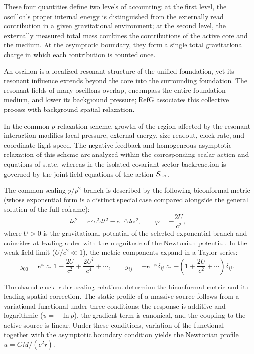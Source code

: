 \documentclass[11pt,a4paper]{article}
\newcommand{\RefG}{\mathrm{RefG}}
\begin{document}
These four quantities define two levels of accounting: at the first level, the oscillon's proper internal energy is distinguished from the externally read contribution in a given gravitational environment; at the second level, the externally measured total mass combines the contributions of the active core and the medium. At the asymptotic boundary, they form a single total gravitational charge in which each contribution is counted once.

An oscillon is a localized resonant structure of the unified foundation, yet its resonant influence extends beyond the core into the surrounding foundation. The resonant fields of many oscillons overlap, encompass the entire foundation-medium, and lower its background pressure; $\RefG$ associates this collective process with background spatial relaxation.

In the common-$p$ relaxation scheme, growth of the region affected by the resonant interaction modifies local pressure, external energy, size readout, clock rate, and coordinate light speed. The negative feedback and homogeneous asymptotic relaxation of this scheme are analyzed within the corresponding scalar action and equations of state, whereas in the isolated covariant sector backreaction is governed by the joint field equations of the action $S_{\rm iso}$.

The common-scaling $p/p^2$ branch is described by the following biconformal metric (whose exponential form is a distinct special case compared alongside the general solution of the full coframe):
\begin{equation}
ds^2 = e^\varphi c^2 dt^2 - e^{-\varphi} d\boldsymbol{\sigma}^2, \qquad \varphi = -\frac{2U}{c^2},
\end{equation}
where $U>0$ is the gravitational potential of the selected exponential branch and coincides at leading order with the magnitude of the Newtonian potential. In the weak-field limit ($U/c^2 \ll 1$), the metric components expand in a Taylor series:
\begin{equation}
g_{00} = e^\varphi \approx 1 - \frac{2U}{c^2} + \frac{2U^2}{c^4} + \cdots, \qquad g_{ij} = -e^{-\varphi}\delta_{ij} \approx -\left(1 + \frac{2U}{c^2} + \cdots\right)\delta_{ij}.
\end{equation}

The shared clock--ruler scaling relations determine the biconformal metric and its leading spatial correction. The static profile of a massive source follows from a variational functional under three conditions: the response is additive and logarithmic ($u=-\ln p$), the gradient term is canonical, and the coupling to the active source is linear. Under these conditions, variation of the functional together with the asymptotic boundary condition yields the Newtonian profile $u=GM/(c^2r)$.
\end{document}
